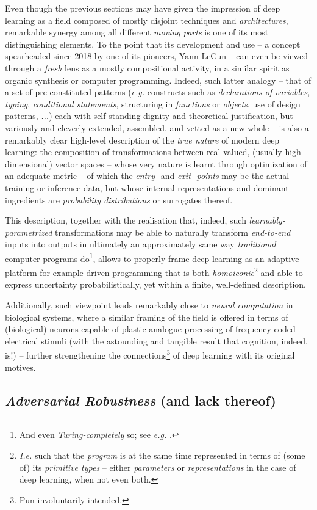 Even though the previous sections may have given the impression of deep learning as a field composed of mostly disjoint techniques and \textit{architectures}, remarkable synergy among all different \textit{moving parts} is one of its most distinguishing elements. To the point that its development and use -- a concept spearheaded since 2018 by one of its pioneers, Yann LeCun -- can even be viewed through a \textit{fresh} lens as a mostly compositional activity, in a similar spirit as organic synthesis or computer programming. Indeed, such latter analogy -- that of a set of pre-constituted patterns (\textit{e.g.} constructs such as \textit{declarations of variables}, \textit{typing}, \textit{conditional statements}, structuring in \textit{functions} or \textit{objects}, use of design patterns, \textit{...}) each with self-standing dignity and theoretical justification, but variously and cleverly extended, assembled, and vetted as a new whole -- is also a remarkably clear high-level description of the \textit{true nature} of modern deep learning: the composition of transformations between real-valued, (usually high-dimensional) vector spaces -- whose very nature is learnt through optimization of an adequate metric -- of which the \textit{entry-} and \textit{exit-} \textit{points} may be the actual training or inference data, but whose internal representations and dominant ingredients are \textit{probability distributions} or surrogates thereof.

This description, together with the realisation that, indeed, such \textit{learnably-parametrized} transformations may be able to naturally transform \textit{end-to-end} inputs into outputs in ultimately an approximately same way \textit{traditional} computer programs do\footnote{And even \textit{Turing-completely} so; see \textit{e.g.} \cite{PerezEtAl2018Turing}.}, allows to properly frame deep learning as an adaptive platform for example-driven programming that is both \textit{homoiconic}\footnote{\textit{I.e.} such that the \textit{program} is at the same time represented in terms of (some of) its \textit{primitive types} -- either \textit{parameters} or \textit{representations} in the case of deep learning, when not even both.} and able to express uncertainty probabilistically, yet within a finite, well-defined description.

Additionally, such viewpoint leads remarkably close to \textit{neural computation} in biological systems, where a similar framing of the field is offered in terms of (biological) neurons capable of plastic analogue processing of frequency-coded electrical stimuli (with the astounding and tangible result that cognition, indeed, is!) -- further strengthening the connections\footnote{Pun involuntarily intended.} of deep learning with its original motives.






\subsection{\textit{Adversarial Robustness} (and lack thereof)}
